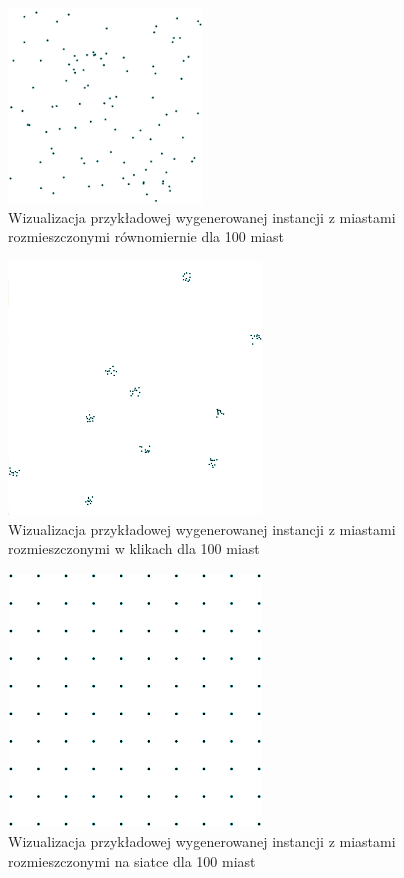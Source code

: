 \begin{figure}[h!]
    \centering
    \includegraphics[width=0.46\textwidth]{chapters/experiments/img/uniform_example.png}
    \caption{Wizualizacja przykładowej wygenerowanej instancji z miastami rozmieszczonymi równomiernie dla 100 miast}
    \label{fig:uniform_example}
\end{figure}

\newpage

\begin{figure}[h!]
    \centering
    \includegraphics[width=0.60\textwidth]{chapters/experiments/img/clique_example.png}
    \caption{Wizualizacja przykładowej wygenerowanej instancji z miastami rozmieszczonymi w klikach dla 100 miast}
    \label{fig:clique_example}
\end{figure}

\begin{figure}[h!]
    \centering
    \includegraphics[width=0.60\textwidth]{chapters/experiments/img/grid_example.png}
    \caption{Wizualizacja przykładowej wygenerowanej instancji z miastami rozmieszczonymi na siatce dla 100 miast}
    \label{fig:grid_example}
\end{figure}

